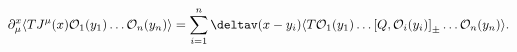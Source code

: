 \begin{equation}
\label{eq:wt_allg}
 \partial^x_\mu\langle T J^\mu(x) 
 \mathcal{O}_1(y_1)\dots \mathcal{O}_n(y_n)\rangle 
 =\sum_{i=1}^n\deltav(x-y_i)\langle T \mathcal{O}_1(y_1)\dots
 \left[Q,\mathcal{O}_i(y_i)\right]_\pm \dots\mathcal{O}_n(y_n)\rangle.
\end{equation}

